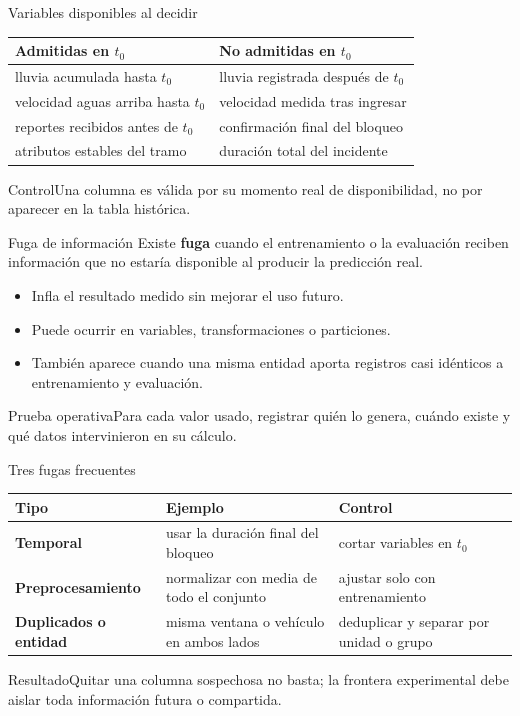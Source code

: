 \documentclass[aspectratio=169,10pt]{beamer}
\newcommand{\concepto}[1]{\textcolor{UAPTeal}{\textbf{#1}}}
\begin{document}
\begin{frame}{Variables disponibles al decidir}
  \small
  \begin{tabularx}{\textwidth}{XX}\toprule
  \textbf{Admitidas en $t_0$} & \textbf{No admitidas en $t_0$}\\\midrule
  lluvia acumulada hasta $t_0$ & lluvia registrada después de $t_0$\\
  velocidad aguas arriba hasta $t_0$ & velocidad medida tras ingresar\\
  reportes recibidos antes de $t_0$ & confirmación final del bloqueo\\
  atributos estables del tramo & duración total del incidente\\\bottomrule
  \end{tabularx}
  \begin{alertblock}{Control}Una columna es válida por su momento real de disponibilidad, no por aparecer en la tabla histórica.\end{alertblock}
\end{frame}

\begin{frame}{Fuga de información}
  \small Existe \concepto{fuga} cuando el entrenamiento o la evaluación reciben información que no estaría disponible al producir la predicción real.
  \begin{itemize}
    \item Infla el resultado medido sin mejorar el uso futuro.
    \item Puede ocurrir en variables, transformaciones o particiones.
    \item También aparece cuando una misma entidad aporta registros casi idénticos a entrenamiento y evaluación.
  \end{itemize}
  \begin{block}{Prueba operativa}Para cada valor usado, registrar quién lo genera, cuándo existe y qué datos intervinieron en su cálculo.\end{block}
\end{frame}

\begin{frame}{Tres fugas frecuentes}
  \scriptsize
  \begin{tabularx}{\textwidth}{>{\bfseries}p{}Xp{}}\toprule
  Tipo & Ejemplo & Control\\\midrule
  Temporal & usar la duración final del bloqueo & cortar variables en $t_0$\\
  Preprocesamiento & normalizar con media de todo el conjunto & ajustar solo con entrenamiento\\
  Duplicados o entidad & misma ventana o vehículo en ambos lados & deduplicar y separar por unidad o grupo\\\bottomrule
  \end{tabularx}
  \begin{block}{Resultado}Quitar una columna sospechosa no basta; la frontera experimental debe aislar toda información futura o compartida.\end{block}
\end{frame}
\end{document}
